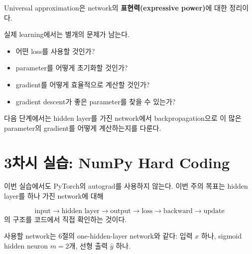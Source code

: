 \documentclass[11pt,a4paper]{article}
\newcommand{\sigmoid}{\sigma}
\begin{document}
\begin{keybox}
Universal approximation은 network의 \textbf{표현력(expressive power)}에 대한 정리이다.

실제 learning에서는 별개의 문제가 남는다.

\begin{itemize}[leftmargin=1.8em]
\item 어떤 loss를 사용할 것인가?
\item parameter를 어떻게 초기화할 것인가?
\item gradient를 어떻게 효율적으로 계산할 것인가?
\item gradient descent가 좋은 parameter를 찾을 수 있는가?
\end{itemize}

다음 단계에서는 hidden layer를 가진 network에서
backpropagation으로 이 많은 parameter의 gradient를 어떻게 계산하는지를 다룬다.
\end{keybox}

\section{3차시 실습: NumPy Hard Coding}

이번 실습에서도 PyTorch의 autograd를 사용하지 않는다.
이번 주의 목표는 hidden layer를 하나 가진 network에 대해

\[
\boxed{
\text{input}
\rightarrow
\text{hidden layer}
\rightarrow
\text{output}
\rightarrow
\text{loss}
\rightarrow
\text{backward}
\rightarrow
\text{update}
}
\]
의 구조를 코드에서 직접 확인하는 것이다.

사용할 network는 6절의 one-hidden-layer network와 같다:
입력 $x$ 하나, sigmoid hidden neuron $m=2$개, 선형 출력 $\widehat y$ 하나.

\begin{center}
\end{center}
\end{document}
